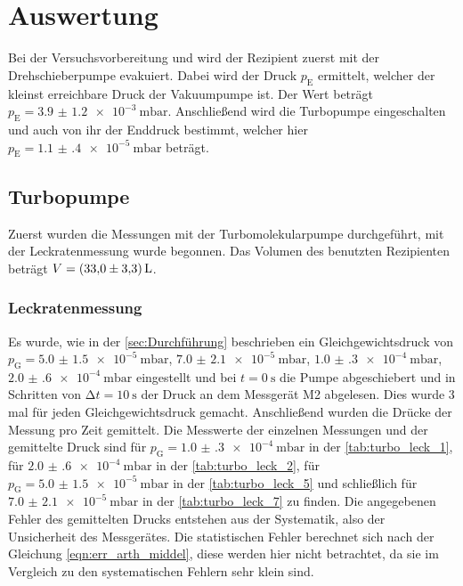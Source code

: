 \section{Auswertung}
\label{sec:Auswertung}

\noindent Bei der Versuchsvorbereitung und wird der Rezipient zuerst mit der Drehschieberpumpe evakuiert. Dabei wird der Druck $p_\text{E}$ ermittelt, welcher der kleinst erreichbare Druck 
der Vakuumpumpe ist. Der Wert beträgt $p_\text{E} = \SI{3.9(12)e-3}{\milli\bar}$. Anschließend wird die Turbopumpe eingeschalten und auch von ihr der Enddruck bestimmt, welcher hier 
$p_\text{E} = \SI{1.1(4)e-5}{\milli\bar}$ beträgt. 

\subsection{Turbopumpe}

  \noindent Zuerst wurden die Messungen mit der Turbomolekularpumpe durchgeführt, mit der Leckratenmessung wurde begonnen. Das Volumen des benutzten Rezipienten beträgt $V = \SI{33 \pm 3.3}{L}$. 
  
  \subsubsection{Leckratenmessung}

    \noindent Es wurde, wie in der \autoref{sec:Durchführung} beschrieben ein Gleichgewichtsdruck von $p_\text{G} = \SI{5.0(15)e-5}{\milli\bar}$, $\SI{7.0(21)e-5}{\milli\bar}$, $\SI{1.0(3)e-4}{\milli\bar}$, $\SI{2.0(6)e-4}{\milli\bar}$ eingestellt 
    und bei $t = \SI{0}{\second}$ die Pumpe abgeschiebert und in Schritten von $\increment t = \SI{10}{\second}$ der Druck an dem Messgerät M2 abgelesen. Dies wurde 3 mal für jeden 
    Gleichgewichtsdruck gemacht. Anschließend wurden die Drücke der Messung pro Zeit gemittelt. Die Messwerte der einzelnen Messungen und der gemittelte Druck sind für $p_\text{G} = \SI{1.0(3)e-4}{\milli\bar}$ in der \autoref{tab:turbo_leck_1}, für 
    $\SI{2.0(6)e-4}{\milli\bar}$ in der \autoref{tab:turbo_leck_2}, für $p_\text{G} = \SI{5.0(15)e-5}{\milli\bar}$ in der \autoref{tab:turbo_leck_5} und schließlich für $\SI{7.0(21)e-5}{\milli\bar}$ in der \autoref{tab:turbo_leck_7} zu finden. 
    Die angegebenen Fehler des gemittelten Drucks entstehen aus der Systematik, also der Unsicherheit des Messgerätes. Die statistischen Fehler berechnet sich nach der Gleichung \eqref{eqn:err_arth_middel}, diese werden hier nicht betrachtet, da 
    sie im Vergleich zu den systematischen Fehlern sehr klein sind.

